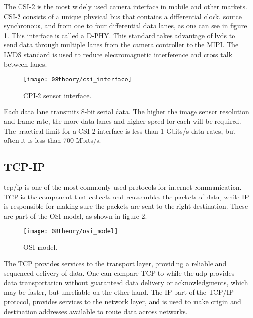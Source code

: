 The CSI-2 is the most widely used camera interface in mobile and other markets. CSI-2 consists of a unique physical bus that contains a differential clock, source synchronous, and from one to four differential data lanes, as one can see in figure \ref{fig:csi_interface}. This interface is called a D-PHY. This standard takes advantage of \ac{lvds} to send data through multiple lanes from the camera controller to the MIPI. The LVDS standard is used to reduce electromagnetic interference and cross talk between lanes.

\begin{figure}[H]
	\centering
	\texttt{[image: 08theory/csi\_interface]}
	\caption{CPI-2 sensor interface.}
	\label{fig:csi_interface}
\end{figure}

Each data lane transmits 8-bit serial data. The higher the image sensor resolution and frame rate, the more data lanes and higher speed for each will be required. The practical limit for a CSI-2 interface is less than 1 Gbits/s data rates, but often it is less than 700 Mbits/s. \cite{csi_interface}

\clearpage
\subsection{TCP-IP}
\ac{tcp}/\ac{ip} is one of the most commonly used protocols for internet communication. TCP is the component that collects and reassembles the packets of data, while IP is responsible for making sure the packets are sent to the right destination. These are part of the OSI model, as shown in figure \ref{fig:osi_model}.

\begin{figure}[H]
	\centering
	\texttt{[image: 08theory/osi\_model]}
	\caption{OSI model.}
	\label{fig:osi_model}
\end{figure}

The TCP provides services to the transport layer, providing a reliable and sequenced delivery of data. One can compare TCP to while the \ac{udp} provides data transportation without guaranteed data delivery or acknowledgments, which may be faster, but unreliable on the other hand. The IP part of the TCP/IP protocol, provides services to the network layer, and is used to make origin and destination addresses available to route data across networks.

\clearpage
{}


